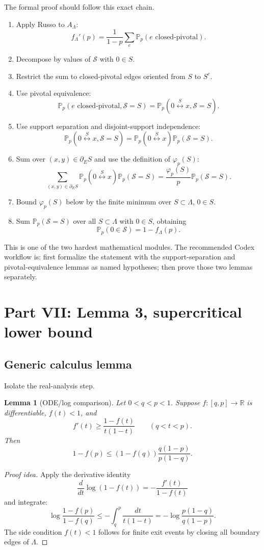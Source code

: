 \documentclass[11pt]{article}
\newcommand{\R}{\mathbb R}
\newcommand{\PP}{\mathbb P}
\newcommand{\conn}{\longleftrightarrow}
\newcommand{\Lam}{\Lambda}
\newcommand{\dE}{\partial_E}
\theoremstyle{definition}
\theoremstyle{plain}
\newtheorem{lemma}[definition]{Lemma}
\begin{document}
The formal proof should follow this exact chain.
\begin{enumerate}[leftmargin=1.4em]
  \item Apply Russo to $A_\Lam$:
  \[
    f_\Lam'(p)=\frac1{1-p}\sum_e \PP_p(e\text{ closed-pivotal}).
  \]
  \item Decompose by values of $\mathcal S$ with $0\in S$.
  \item Restrict the sum to closed-pivotal edges oriented from $S$ to $S^c$.
  \item Use pivotal equivalence:
  \[
    \PP_p(e\text{ closed-pivotal},\mathcal S=S)
    =\PP_p(0\stackrel S\conn x,\mathcal S=S).
  \]
  \item Use support separation and disjoint-support independence:
  \[
    \PP_p(0\stackrel S\conn x,\mathcal S=S)
    =\PP_p(0\stackrel S\conn x)\PP_p(\mathcal S=S).
  \]
  \item Sum over $(x,y)\in\dE S$ and use the definition of $\varphi_p(S)$:
  \[
    \sum_{(x,y)\in\dE S}
    \PP_p(0\stackrel S\conn x)\PP_p(\mathcal S=S)
    =\frac{\varphi_p(S)}{p}\PP_p(\mathcal S=S).
  \]
  \item Bound $\varphi_p(S)$ below by the finite minimum over $S\subset\Lam$, $0\in S$.
  \item Sum $\PP_p(\mathcal S=S)$ over all $S\subset\Lam$ with $0\in S$, obtaining
  \[
    \PP_p(0\in\mathcal S)=1-f_\Lam(p).
  \]
\end{enumerate}

This is one of the two hardest mathematical modules.  The recommended Codex workflow is: first formalize the statement with the support-separation and pivotal-equivalence lemmas as named hypotheses; then prove those two lemmas separately.

\section{Part VII: Lemma 3, supercritical lower bound}

\subsection{Generic calculus lemma}

Isolate the real-analysis step.

\begin{lemma}[ODE/log comparison]
Let $0<q<p<1$.  Suppose $f:[q,p]\to\R$ is differentiable, $f(t)<1$, and
\[
  f'(t)\ge \frac{1-f(t)}{t(1-t)}
  \qquad (q<t<p).
\]
Then
\[
  1-f(p)
  \le
  (1-f(q))\frac{q(1-p)}{p(1-q)}.
\]
\end{lemma}
\begin{proof}[Proof idea]
Apply the derivative identity
\[
  \frac{d}{dt}\log(1-f(t))=-\frac{f'(t)}{1-f(t)}
\]
and integrate:
\[
  \log\frac{1-f(p)}{1-f(q)}
  \le
  -\int_q^p\frac{dt}{t(1-t)}
  =-\log\frac{p(1-q)}{q(1-p)}.
\]
The side condition $f(t)<1$ follows for finite exit events by closing all boundary edges of $\Lam$.
\end{proof}
\end{document}
